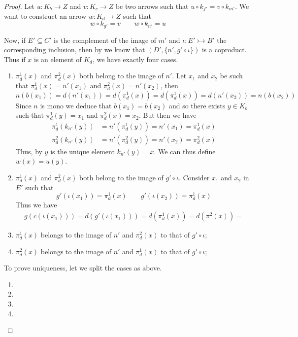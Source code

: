 \documentclass[a4paper,UKenglish,cleveref,pdftex,thm-restate,numberwithinsect]{lipics-v2021}
\newcommand{\mto}{\rightarrowtail}
\begin{document}
\begin{proof} 
	Let $u\colon K_b\to Z$ and $v\colon K_c\to Z$ be two arrows such that $u\circ k_{f'}=v\circ k_{m'}$. We want to construct an arrow $w\colon K_d\to Z$ such that 
	\[w\circ k_{g'}=v \qquad w\circ k_{n'}=u\] 
	
	Now, if $E'\subseteq C'$ is the complement of the image of $m'$ and $\iota\colon E'\mto B'$ the corresponding inclusion, then by  we know that $(D', \{n', g'\circ \iota\})$ is a coproduct. Thus if $x$ is an element of $K_d$, we have exactly four cases.
	
	\begin{enumerate}
		\item $\pi^1_d(x)$ and $\pi^2_d(x)$ both belong to the image of $n'$. Let $x_1$ and $x_2$ be such that $\pi^1_d(x)=n'(x_1)$ and $\pi^2_d(x)=n'(x_2)$, then 
		\[n(b(x_1))=d(n'(x_1))=d(\pi^1_d(x))=d(\pi^1_d(x))=d(n'(x_2))=n(b(x_2)) \]
		Since $n$ is mono we deduce that $b(x_1)=b(x_2)$ and so there exists $y\in K_{b}$ such that $\pi^1_d(y)=x_1$ and $\pi^2_d(x)=x_2$. But then we have
		\begin{align*}
	\pi^1_d(k_{n'}(y))&=n'(\pi^1_d(y)) =n'(x_1)=\pi^1_d(x)\\
	\pi^2_d(k_{n'}(y))&=n'(\pi^2_d(y)) =n'(x_2)=\pi^2_d(x)
		\end{align*}
		Thus, by  $y$ is the unique element $k_{n'}(y)=x$. We can thus define $w(x)=u(y)$. 
		\item $\pi^1_d(x)$ and $\pi^2_d(x)$ both belong to the image of $g'\circ \iota$. Consider $x_1$ and $x_2$ in $E'$ such that
		\[g'(\iota(x_1))=\pi^1_d(x) \qquad  g'(\iota(x_2))=\pi^1_d(x)\]
		Thus we have
		\begin{align*}
			g(c(\iota(x_1)))=d(g'(\iota(x_1)))=d(\pi^1_d(x))=d(\pi^2(x))=
		\end{align*}
		
		\item $\pi^1_d(x)$ belongs to the image of $n'$  and $\pi^2_d(x)$ to that of $g'\circ \iota$;
		\item $\pi^2_d(x)$ belongs to the image of $n'$  and $\pi^1_d(x)$ to that of $g'\circ \iota$;
	\end{enumerate} 

	
	To prove uniqueness, let we split the cases as above.
	\begin{enumerate}
		\item 
		\item 
		\item 
		\item \qedhere
	\end{enumerate}
	

\end{proof}
\end{document}
